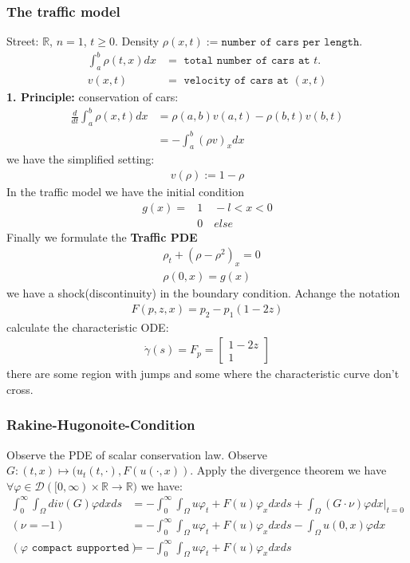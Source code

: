 \documentclass[a4paper,11pt,oneside,fleqn]{book}
\theoremstyle{definition}
\theoremstyle{remark}
\begin{document}
\subsubsection*{The traffic model}
Street: $\mathbb{R}$, $n = 1$, $t \geq 0$. Density $\rho(x, t):= \texttt{number of cars per length}$. 
\begin{align*}
	\int_a^b \rho(t, x) dx &= \texttt{ total number of cars at $t$. }\\
	v(x, t) &= \texttt{ velocity of cars at } (x, t)
\end{align*}
\textbf{1. Principle:} conservation of cars:
\begin{align*}
	\frac{d}{dt} \int_a^b \rho(x, t)dx &= \rho(a, b) v(a, t) - \rho(b, t) v(b, t)\\
	&= - \int_a^b (\rho v)_x dx 
\end{align*}
we have the simplified setting:
\begin{align*}
	v(\rho):= 1 - \rho
\end{align*}
In the traffic model we have the initial condition
\begin{align*}
	g(x) = & 1 \quad - l < x < 0\\
	&0 \quad else
\end{align*}
Finally we formulate the \textbf{Traffic PDE}
\begin{align*}
	&\rho_t + (\rho - \rho^2)_x = 0\\
	&\rho(0, x)= g(x)
\end{align*}
we have a shock(discontinuity) in the boundary condition. Achange the notation
\begin{align*}
	F(p, z, x) = p_2 - p_1(1 - 2 z)
\end{align*}
calculate the characteristic ODE:
\begin{align*}
	\dot{\gamma}(s) = F_p = 
	\begin{bmatrix}
		1 - 2z\\
		1
	\end{bmatrix}
\end{align*}
there are some region with jumps and some where the characteristic curve don't cross. 

\subsubsection*{Rakine-Hugonoite-Condition}
Observe the PDE of scalar conservation law. Observe $G: (t, x) \mapsto (u_t(t, \cdot), F(u(\cdot, x))$.  Apply the divergence theorem we have $\forall \varphi \in \mathcal{D}([0, \infty) \times \mathbb{R} \rightarrow \mathbb{R})$ we have:
\begin{align*}
	\int_0^\infty\int_\Omega div(G) \varphi dx ds
	&= -\int_0^\infty\int_\Omega u \varphi_t + F(u) \varphi_x dx ds + \int_\Omega (G \cdot \nu) \varphi dx|_{t = 0} \\
	(\nu = -1)
	&= -\int_0^\infty\int_\Omega u \varphi_t + F(u) \varphi_x dxds - \int_\Omega u(0, x) \varphi dx\\
	(\varphi \texttt{ compact supported})
	&= -\int_0^\infty\int_\Omega u \varphi_t + F(u) \varphi_x dxds 
\end{align*}
\end{document}
